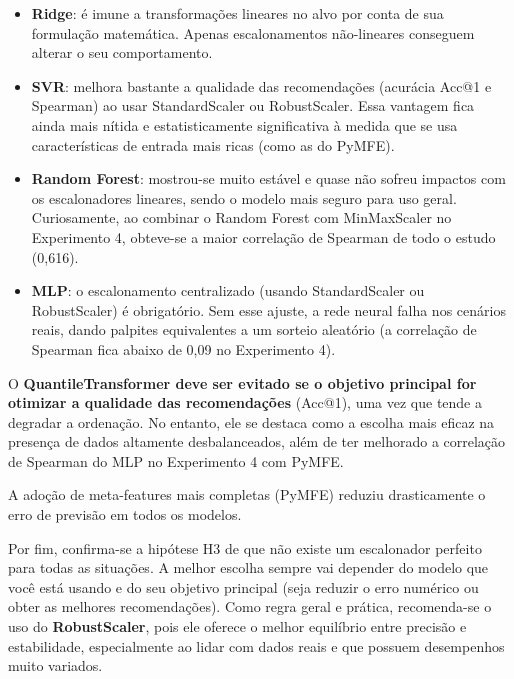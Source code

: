 \documentclass[12pt]{article}
\begin{document}
\begin{itemize}
  \item \textbf{Ridge}: é imune a transformações lineares no alvo por conta de sua formulação matemática. Apenas escalonamentos não-lineares conseguem alterar o seu comportamento.
  \item \textbf{SVR}: melhora bastante a qualidade das recomendações (acurácia Acc@1 e Spearman) ao usar StandardScaler ou RobustScaler. Essa vantagem fica ainda mais nítida e estatisticamente significativa à medida que se usa características de entrada mais ricas (como as do PyMFE).
  \item \textbf{Random Forest}: mostrou-se muito estável e quase não sofreu impactos com os escalonadores lineares, sendo o modelo mais seguro para uso geral. Curiosamente, ao combinar o Random Forest com MinMaxScaler no Experimento 4, obteve-se a maior correlação de Spearman de todo o estudo (0,616).
  \item \textbf{MLP}: o escalonamento centralizado (usando StandardScaler ou RobustScaler) é obrigatório. Sem esse ajuste, a rede neural falha nos cenários reais, dando palpites equivalentes a um sorteio aleatório (a correlação de Spearman fica abaixo de 0,09 no Experimento 4).
\end{itemize}

O \textbf{QuantileTransformer deve ser evitado se o objetivo principal for otimizar a qualidade das recomendações} (Acc@1), uma vez que tende a degradar a ordenação. No entanto, ele se destaca como a escolha mais eficaz na presença de dados altamente desbalanceados, além de ter melhorado a correlação de Spearman do MLP no Experimento 4 com PyMFE.

A adoção de meta-features mais completas (PyMFE) reduziu drasticamente o erro de previsão em todos os modelos.

Por fim, confirma-se a hipótese H3 de que não existe um escalonador perfeito para todas as situações. A melhor escolha sempre vai depender do modelo que você está usando e do seu objetivo principal (seja reduzir o erro numérico ou obter as melhores recomendações). Como regra geral e prática, recomenda-se o uso do \textbf{RobustScaler}, pois ele oferece o melhor equilíbrio entre precisão e estabilidade, especialmente ao lidar com dados reais e que possuem desempenhos muito variados.



\end{document}
